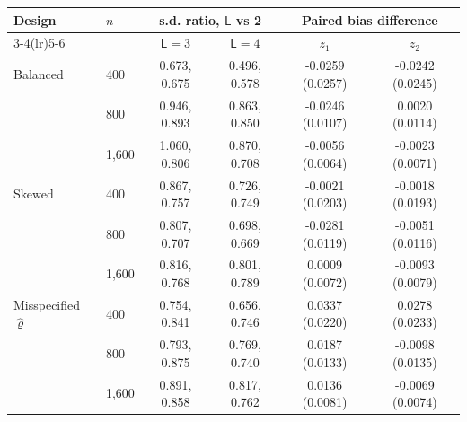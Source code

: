\begin{tabular}{llcccc}
\toprule
Design & $n$ & \multicolumn{2}{c}{s.d. ratio, $\mathsf L$ vs 2} & \multicolumn{2}{c}{Paired bias difference} \\
\cmidrule(lr){3-4}\cmidrule(lr){5-6}
 & & $\mathsf L=3$ & $\mathsf L=4$ & $z_1$ & $z_2$ \\
\midrule
Balanced & 400 & 0.673, 0.675 & 0.496, 0.578 & -0.0259 (0.0257) & -0.0242 (0.0245) \\
 & 800 & 0.946, 0.893 & 0.863, 0.850 & -0.0246 (0.0107) & 0.0020 (0.0114) \\
 & 1,600 & 1.060, 0.806 & 0.870, 0.708 & -0.0056 (0.0064) & -0.0023 (0.0071) \\
\addlinespace
Skewed & 400 & 0.867, 0.757 & 0.726, 0.749 & -0.0021 (0.0203) & -0.0018 (0.0193) \\
 & 800 & 0.807, 0.707 & 0.698, 0.669 & -0.0281 (0.0119) & -0.0051 (0.0116) \\
 & 1,600 & 0.816, 0.768 & 0.801, 0.789 & 0.0009 (0.0072) & -0.0093 (0.0079) \\
\addlinespace
Misspecified $\hat\varrho$ & 400 & 0.754, 0.841 & 0.656, 0.746 & 0.0337 (0.0220) & 0.0278 (0.0233) \\
 & 800 & 0.793, 0.875 & 0.769, 0.740 & 0.0187 (0.0133) & -0.0098 (0.0135) \\
 & 1,600 & 0.891, 0.858 & 0.817, 0.762 & 0.0136 (0.0081) & -0.0069 (0.0074) \\
\bottomrule
\end{tabular}
